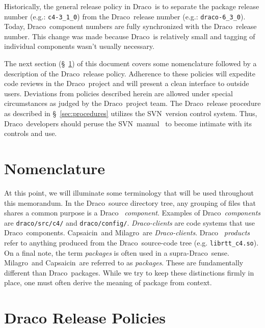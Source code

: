 \documentclass[note]{newmemo}
\newcommand{\draco}{{\normalfont\small\sffamily Draco}}
\newcommand{\milagro}{{\normalfont\small\sffamily Milagro}}
\newcommand{\capsaicin}{{\normalfont\small\sffamily Capsaicin}}
\newcommand{\svn}{\textsf{SVN}}
\begin{document}
Historically, the general release policy in \draco\ is to separate the
package release number (e.g.: \texttt{c4-3\_1\_0}) from the
\draco\ release number (e.g.: \texttt{draco-6\_3\_0}).  Today,
\draco\ component numbers are fully synchronized with the
\draco\ release number.  This change was made because \draco\ is
relatively small and tagging of individual components wasn't usually
necessary.

The next section (\S~\ref{sec:nomenclature}) of this document covers
some nomenclature followed by a description of the \draco\ release
policy.  Adherence to these policies will expedite code reviews in the
\draco\ project and will present a clean interface to outside users.
Deviations from policies described herein are allowed under special
circumstances as judged by the \draco\ project team.  The
\draco\ release procedure as described in \S~\ref{sec:procedures}
utilizes the \svn\ version control system.  Thus, \draco\ developers
should peruse the \svn\ manual~\cite{svn-redbean} to become intimate
with its controls and use.

\section{Nomenclature}
\label{sec:nomenclature}

At this point, we will illuminate some terminology that will be used
throughout this memorandum.  In the \draco\ source directory tree, any
grouping of files that shares a common purpose is a \draco\ {\it
  component}.  Examples of \draco\ {\it components} are
\texttt{draco/src/c4/} and \texttt{draco/config/}. {\it
  \draco-clients} are code systems that use \draco\ components.
\capsaicin\ and \milagro\ are {\it \draco-clients}.  \draco\ {\it
  products} refer to anything produced from the \draco\ source-code
tree (e.g. \texttt{librtt\_c4.so}).  On a final note, the term {\it
  packages} is often used in a supra-\draco\ sense.  \milagro\ and
\capsaicin\ are referred to as {\it packages}.  These are
fundamentally different than \draco\ packages.  While we try to keep
these distinctions firmly in place, one must often derive the meaning
of package from context.


 
\section{Draco Release Policies}
\label{sec:policy}
\end{document}
